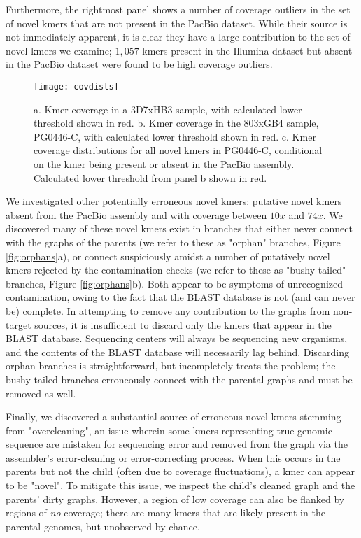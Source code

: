 Furthermore, the rightmost panel shows a number of coverage outliers in the set of novel kmers that are not present in the PacBio dataset.  While their source is not immediately apparent, it is clear they have a large contribution to the set of novel kmers we examine; $1,057$ kmers present in the Illumina dataset but absent in the PacBio dataset were found to be high coverage outliers.

\begin{figure}[h!]
  \centering
    \texttt{[image: covdists]}
  \caption{a. Kmer coverage in a 3D7xHB3 sample, with calculated lower threshold shown in red.  b. Kmer coverage in the 803xGB4 sample, PG0446-C, with calculated lower threshold shown in red.  c. Kmer coverage distributions for all novel kmers in PG0446-C, conditional on the kmer being present or absent in the PacBio assembly.  Calculated lower threshold from panel b shown in red.}
  \label{fig:covdists}
\end{figure}

We investigated other potentially erroneous novel kmers: putative novel kmers absent from the PacBio assembly and with coverage between $10x$ and $74x$.  We discovered many of these novel kmers exist in branches that either never connect with the graphs of the parents (we refer to these as "orphan" branches, Figure \ref{fig:orphans}a), or connect suspiciously amidst a number of putatively novel kmers rejected by the contamination checks (we refer to these as "bushy-tailed" branches, Figure \ref{fig:orphans}b).  Both appear to be symptoms of unrecognized contamination, owing to the fact that the BLAST database is not (and can never be) complete.  In attempting to remove any contribution to the graphs from non-target sources, it is insufficient to discard only the kmers that appear in the BLAST database.  Sequencing centers will always be sequencing new organisms, and the contents of the BLAST database will necessarily lag behind.  Discarding orphan branches is straightforward, but incompletely treats the problem; the bushy-tailed branches erroneously connect with the parental graphs and must be removed as well.

Finally, we discovered a substantial source of erroneous novel kmers stemming from "overcleaning", an issue wherein some kmers representing true genomic sequence are mistaken for sequencing error and removed from the graph via the assembler's error-cleaning or error-correcting process.  When this occurs in the parents but not the child (often due to coverage fluctuations), a kmer can appear to be "novel".  To mitigate this issue, we inspect the child's cleaned graph and the parents' dirty graphs.  However, a region of low coverage can also be flanked by regions of \textit{no} coverage; there are many kmers that are likely present in the parental genomes, but unobserved by chance.

